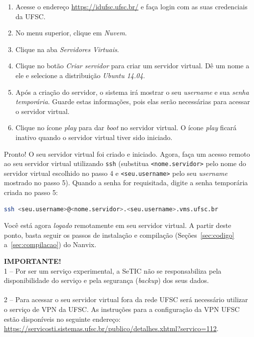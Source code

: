 \documentclass[11pt]{article}
\newcommand*{\alert}[1]{\vspace{0.4cm}\colorbox{gray!60!white}{\parbox{0.92\linewidth}{{\centering \textbf{IMPORTANTE!}\\}#1}}\vspace{0.4cm}}
\begin{document}
\begin{enumerate}
	\item Acesse o endereço \url{https://idufsc.ufsc.br/} e faça login com as suas credenciais da UFSC.
	\item No menu superior, clique em \textit{Nuvem}.
	\item Clique na aba \textit{Servidores Virtuais}.
	\item Clique no botão \textit{Criar servidor} para criar um servidor virtual. Dê um nome a ele e selecione a distribuição \textit{Ubuntu 14.04}.
	\item Após a criação do servidor, o sistema irá mostrar o seu \textit{username} e sua \textit{senha temporária}. Guarde estas informações, pois elas serão necessárias para acessar o servidor virtual.
	\item Clique no ícone \textit{play} para dar \textit{boot} no servidor virtual. O ícone \textit{play} ficará inativo quando o servidor virtual tiver sido iniciado.
\end{enumerate}

Pronto! O seu servidor virtual foi criado e iniciado. Agora, faça um acesso remoto ao seu servidor virtual utilizando \texttt{ssh} (substitua \texttt{<nome.servidor>} pelo nome do servidor virtual escolhido no passo 4 e \texttt{<seu.username>} pelo seu \textit{username} mostrado no passo 5). Quando a senha for requisitada, digite a senha temporária criada no passo 5:\\

\begin{lstlisting}[language=sh,numbers=none,frame=single]
ssh <seu.username>@<nome.servidor>.<seu.username>.vms.ufsc.br
\end{lstlisting}

\vspace{0.3cm}

Você está agora \textit{logado} remotamente em seu servidor virtual. A partir deste ponto, basta seguir os passos de instalação e compilação (Seções~\ref{sec:codigo} a~\ref{sec:compilacao}) do Nanvix. 

\alert{1 -- Por ser um serviço experimental, a SeTIC não se responsabiliza pela disponibilidade do serviço e pela segurança (\textit{backup}) dos seus dados.\\ \vspace{-0.2cm} \\ 2 -- Para acessar o seu servidor virtual fora da rede UFSC será necessário utilizar o serviço de VPN da UFSC. As instruções para a configuração da VPN UFSC estão disponíveis no seguinte endereço: \url{https://servicosti.sistemas.ufsc.br/publico/detalhes.xhtml?servico=112}.}
\end{document}
